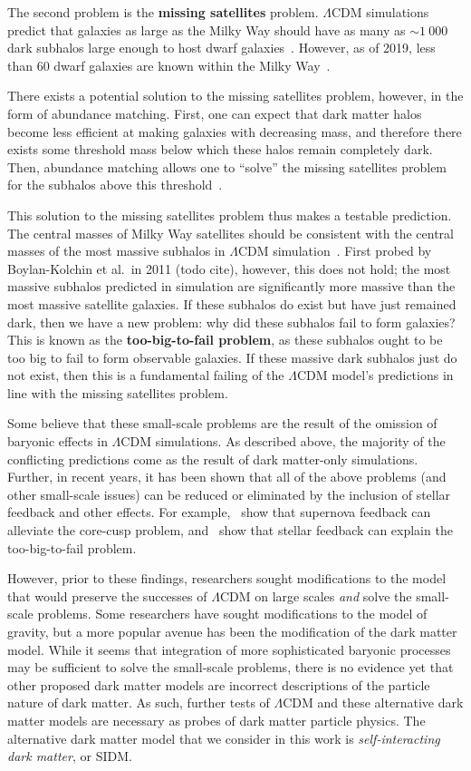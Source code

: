 The second problem is the \textbf{missing satellites} problem.  $\Lambda$CDM
simulations predict that galaxies as large as the Milky Way should have as
many as \(\sim 1~000\) dark subhalos large enough to host dwarf
galaxies~\cite{bullock_small-scale_2017}.  However, as of 2019, less than 60
dwarf galaxies are known within the Milky Way~\cite{simon_faintest_2019}.

There exists a potential solution to the missing satellites problem,
however, in the form of abundance matching. First, one can expect that
dark matter halos become less efficient at making galaxies with
decreasing mass, and therefore there exists some threshold mass below
which these halos remain completely dark. Then, abundance matching
allows one to ``solve'' the missing satellites problem for the subhalos
above this threshold~\cite{bullock_small-scale_2017}.

This solution to the missing satellites problem thus makes a testable
prediction. The central masses of Milky Way satellites should be
consistent with the central masses of the most massive subhalos in
\(\Lambda\)CDM simulation~\cite{bullock_small-scale_2017}. First
probed by Boylan-Kolchin et al.~in 2011 (todo cite), however, this does not
hold; the most massive subhalos predicted in simulation are significantly more
massive than the most massive satellite galaxies. If these subhalos do exist
but have just remained dark, then we have a new problem: why did these
subhalos fail to form galaxies? This is known as the \textbf{too-big-to-fail
problem}, as these subhalos ought to be too big to fail to form observable
galaxies. If these massive dark subhalos just do not exist, then this is a
fundamental failing of the \(\Lambda\)CDM model's predictions in line with the
missing satellites problem.

Some believe that these small-scale problems are the result of the omission of
baryonic effects in \(\Lambda\)CDM simulations. As described above, the
majority of the conflicting predictions come as the result of dark matter-only
simulations. Further, in recent years, it has been shown that all of the above
problems (and other small-scale issues) can be reduced or eliminated by the
inclusion of stellar feedback and other effects. For example,~\cite{pontzen_how_2012} show that supernova feedback can alleviate the core-cusp
problem, and~\cite{chan_impact_2015} show that stellar feedback can explain
the too-big-to-fail problem.

However, prior to these findings, researchers sought modifications to the
model that would preserve the successes of \(\Lambda\)CDM on large scales
\emph{and} solve the small-scale problems. Some researchers have sought
modifications to the model of gravity, but a more popular avenue has been the
modification of the dark matter model. While it seems that integration of more
sophisticated baryonic processes may be sufficient to solve the small-scale
problems, there is no evidence yet that other proposed dark matter models are
incorrect descriptions of the particle nature of dark matter. As such, further
tests of \(\Lambda\)CDM and these alternative dark matter models are necessary
as probes of dark matter particle physics. The alternative dark matter model
that we consider in this work is \emph{self-interacting dark matter}, or SIDM.
